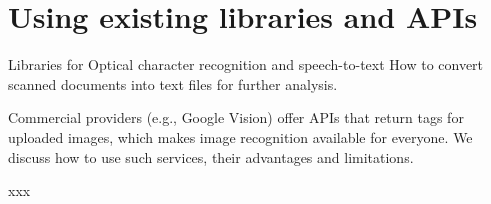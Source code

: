 \section{Using existing libraries and APIs}
\label{sec:apivisions}

Libraries for Optical character recognition and speech-to-text
How to convert scanned documents into text files for further analysis. 


Commercial providers (e.g., Google Vision) offer APIs that return tags for uploaded images, which makes image recognition available for everyone. We discuss how to use such services, their advantages and limitations.



xxx

